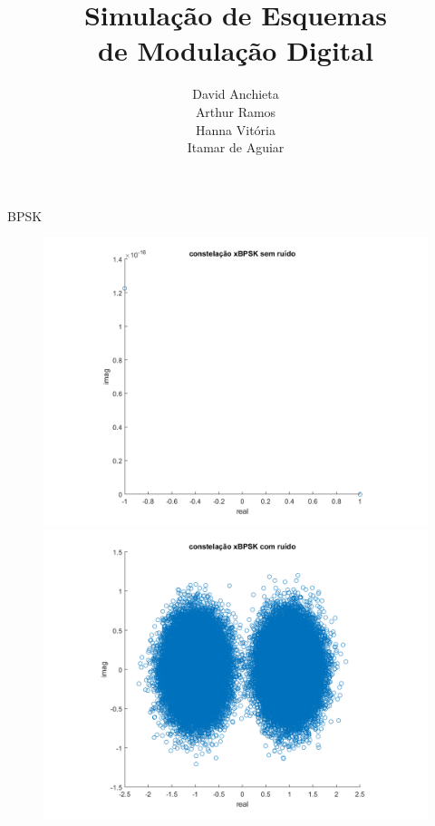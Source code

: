 ﻿\documentclass[mathserif]{beamer}
\title{\textbf{Simulação de Esquemas \\ de Modulação Digital}}
\author{David Anchieta \\ Arthur Ramos \\ Hanna Vitória \\ Itamar de Aguiar}
\begin{document}
	\frame{\titlepage}

	\begin{frame}{BPSK}
		\begin{figure}
			\centering
			\includegraphics[scale=0.3]{../NossoCodigo2/figuras/modula1.png}
			\includegraphics[scale=0.3]{../NossoCodigo2/figuras/modula7.png}
		\end{figure}
	\end{frame}
\end{document}
